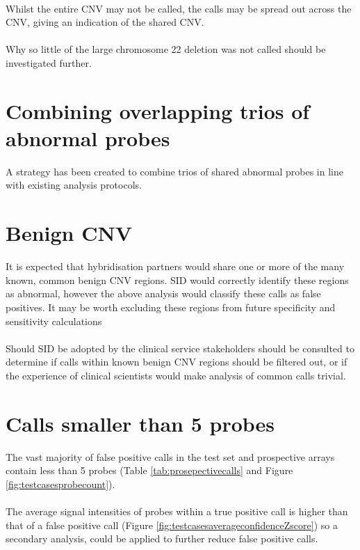 \paragraph*{}
Whilst the entire CNV may not be called, the calls may be spread out across the CNV, giving an indication of the shared CNV.
\paragraph*{}
Why so little of the large chromosome 22 deletion was not called should be investigated further.

\section{Combining overlapping trios of abnormal probes}
A strategy has been created to combine trios of shared abnormal probes in line with existing analysis protocols.

\section{Benign CNV}
It is expected that hybridisation partners would share one or more of the many known, common benign CNV regions. SID would correctly identify these regions as abnormal, however the above analysis would classify these calls as false positives. It may be worth excluding these regions from future specificity and sensitivity calculations
\paragraph*{}
Should SID be adopted by the clinical service stakeholders should be consulted to determine if calls within known benign CNV regions should be filtered out, or  if the experience of clinical scientists would make analysis of common calls trivial.


\section{Calls smaller than 5 probes}
The vast majority of false positive calls in the test set and prospective arrays contain less than 5 probes (Table \ref{tab:prosepectivecalls} and Figure \ref{fig:testcasesprobecount}). 
\paragraph*{}
The average signal intensities of probes within a true positive call is higher than that of a false positive call (Figure \ref{fig:testcasesaverageconfidenceZscore}) so a secondary analysis, could be applied to further reduce false positive calls. 


